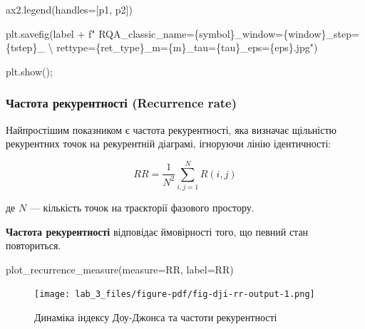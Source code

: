 \documentclass[
  letterpaper,
]{report}
\newenvironment{Shaded}{\begin{snugshade}}{\end{snugshade}}
\newcommand{\CharTok}[1]{\textcolor[rgb]{0.13,0.47,0.30}{#1}}
\newcommand{\NormalTok}[1]{\textcolor[rgb]{0.00,0.23,0.31}{#1}}
\newcommand{\OperatorTok}[1]{\textcolor[rgb]{0.37,0.37,0.37}{#1}}
\newcommand{\SpecialCharTok}[1]{\textcolor[rgb]{0.37,0.37,0.37}{#1}}
\newcommand{\SpecialStringTok}[1]{\textcolor[rgb]{0.13,0.47,0.30}{#1}}
\newcommand{\StringTok}[1]{\textcolor[rgb]{0.13,0.47,0.30}{#1}}
\begin{document}
\begin{Shaded}
\begin{Highlighting}[]
\NormalTok{    ax2.legend(handles}\OperatorTok{=}\NormalTok{[p1, p2])}

\NormalTok{    plt.savefig(label }\OperatorTok{+}
        \SpecialStringTok{f" RQA\_classic\_name=}\SpecialCharTok{\{}\NormalTok{symbol}\SpecialCharTok{\}}\SpecialStringTok{\_window=}\SpecialCharTok{\{}\NormalTok{window}\SpecialCharTok{\}}\SpecialStringTok{\_step=}\SpecialCharTok{\{}\NormalTok{tstep}\SpecialCharTok{\}}\SpecialStringTok{\_ }\CharTok{\textbackslash{}}
\SpecialStringTok{        rettype=}\SpecialCharTok{\{}\NormalTok{ret\_type}\SpecialCharTok{\}}\SpecialStringTok{\_m=}\SpecialCharTok{\{}\NormalTok{m}\SpecialCharTok{\}}\SpecialStringTok{\_tau=}\SpecialCharTok{\{}\NormalTok{tau}\SpecialCharTok{\}}\SpecialStringTok{\_eps=}\SpecialCharTok{\{}\NormalTok{eps}\SpecialCharTok{\}}\SpecialStringTok{.jpg"}\NormalTok{)}
        
\NormalTok{    plt.show()}\OperatorTok{;}
\end{Highlighting}
\end{Shaded}

\hypertarget{ux447ux430ux441ux442ux43eux442ux430-ux440ux435ux43aux443ux440ux435ux43dux442ux43dux43eux441ux442ux456-recurrence-rate}{%
\subsubsection{Частота рекурентності (Recurrence
rate)}\label{ux447ux430ux441ux442ux43eux442ux430-ux440ux435ux43aux443ux440ux435ux43dux442ux43dux43eux441ux442ux456-recurrence-rate}}

Найпростішим показником є частота рекурентності, яка визначає щільністю
рекурентних точок на рекурентній діаграмі, ігноруючи лінію ідентичності:

\[
RR = \frac{1}{N^2}\displaystyle\sum_{i,j=1}^{N}R(i,j)
\]

де \(N\) --- кількість точок на траєкторії фазового простору.

\textbf{Частота рекурентності} відповідає ймовірності того, що певний
стан повториться.

\begin{Shaded}
\begin{Highlighting}[]
\NormalTok{plot\_recurrence\_measure(measure}\OperatorTok{=}\NormalTok{RR, label}\OperatorTok{=}\StringTok{\textquotesingle{}RR\textquotesingle{}}\NormalTok{)}
\end{Highlighting}
\end{Shaded}

\begin{figure}[H]

{\centering \texttt{[image: lab\_3\_files/figure-pdf/fig-dji-rr-output-1.png]}

}

\caption{\label{fig-dji-rr}Динаміка індексу Доу-Джонса та частоти
рекурентності}

\end{figure}
\end{document}
